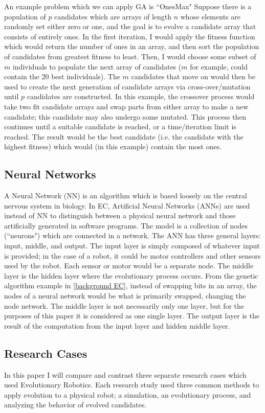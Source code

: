 \documentclass{sig-alternate}
\begin{document}
  An example problem which we can apply GA is ``OnesMax" Suppose there is a population of $p$ candidates which are arrays of length $n$ whose elements are randomly set either zero or one, and the goal is to evolve a candidate array that consists of entirely ones. In the first iteration, I would apply the fitness function which would return the number of ones in an array, and then sort the population of candidates from greatest fitness to least. Then, I would choose some subset of $m$ individuals to populate the next array of candidates ($m$ for example, could contain the 20 best individuals). The $m$ candidates that move on would then be used to create the next generation of candidate arrays via cross-over/mutation until $p$ candidates are constructed. In this example, the crossover process would take two fit candidate arrays and swap parts from either array to make a new candidate; this candidate may also undergo some mutated. This process then continues until a suitable candidate is reached, or a time/iteration limit is reached. The result would be the best candidate (i.e. the candidate with the highest fitness) which would (in this example) contain the most ones.
  
\subsection{Neural Networks}
	A Neural Network (NN) is an algorithm which is based loosely on the central nervous system in biology. In EC, Artificial Neural Networks (ANNs) are used instead of NN to distinguish between a physical neural network and those artificially generated in software programs. The model is a collection of nodes (``neurons") which are connected in a network. The ANN has three general layers: input, middle, and output. The input layer is simply composed of whatever input is provided; in the case of a robot, it could be motor controllers and other sensors used by the robot. Each sensor or motor would be a separate node. The middle layer is the hidden layer where the evolutionary process occurs. From the genetic algorithm example in \ref{background EC}, instead of swapping bits in an array, the nodes of a neural network would be what is primarily swapped, changing the node network. The middle layer is not necessarily only one layer, but for the purposes of this paper it is considered as one single layer. The output layer is the result of the computation from the input layer and hidden middle layer.
  
  
  \subsection{Research Cases}
	In this paper I will compare and contrast three separate research cases which used Evolutionary Robotics. Each research study used three common methods to apply evolution to a physical robot; a simulation, an evolutionary process, and analyzing the behavior of evolved candidates.
	
\end{document}
